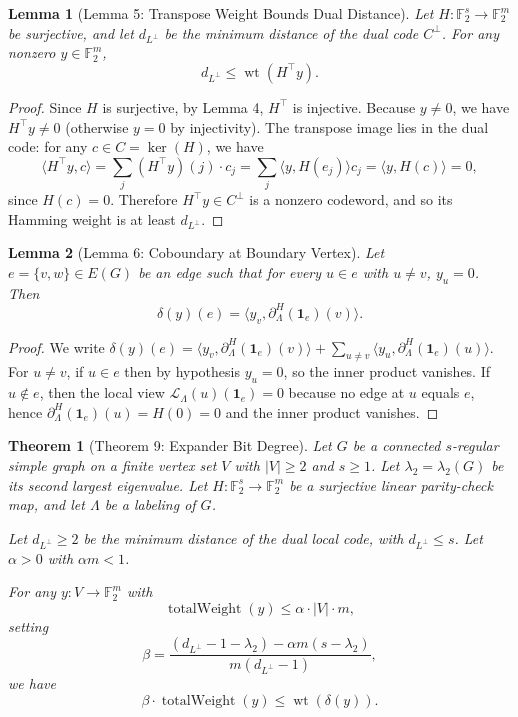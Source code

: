 \documentclass[11pt]{article}
\theoremstyle{plain}
\newtheorem*{theorem}{Theorem}
\newtheorem*{lemma}{Lemma}
\theoremstyle{definition}
\theoremstyle{remark}
\renewcommand{\ker}{\operatorname{ker}}
\begin{document}
\begin{lemma}[Lemma 5: Transpose Weight Bounds Dual Distance]
Let $H : \mathbb{F}_2^s \to \mathbb{F}_2^m$ be surjective, and let $d_{L^\perp}$ be the minimum distance of the dual code $C^\perp$. For any nonzero $y \in \mathbb{F}_2^m$,
\[
d_{L^\perp} \leq \operatorname{wt}(H^\top y).
\]
\end{lemma}

\begin{proof}
Since $H$ is surjective, by Lemma 4, $H^\top$ is injective. Because $y \neq 0$, we have $H^\top y \neq 0$ (otherwise $y = 0$ by injectivity). The transpose image lies in the dual code: for any $c \in C = \ker(H)$, we have
\[
\langle H^\top y, c \rangle = \sum_j (H^\top y)(j) \cdot c_j = \sum_j \langle y, H(e_j) \rangle c_j = \langle y, H(c) \rangle = 0,
\]
since $H(c) = 0$. Therefore $H^\top y \in C^\perp$ is a nonzero codeword, and so its Hamming weight is at least $d_{L^\perp}$.
\end{proof}

\begin{lemma}[Lemma 6: Coboundary at Boundary Vertex]
Let $e = \{v, w\} \in E(G)$ be an edge such that for every $u \in e$ with $u \neq v$, $y_u = 0$. Then
\[
\delta(y)(e) = \langle y_v, \partial_\Lambda^H(\mathbf{1}_e)(v) \rangle.
\]
\end{lemma}

\begin{proof}
We write $\delta(y)(e) = \langle y_v, \partial_\Lambda^H(\mathbf{1}_e)(v) \rangle + \sum_{u \neq v} \langle y_u, \partial_\Lambda^H(\mathbf{1}_e)(u) \rangle$. For $u \neq v$, if $u \in e$ then by hypothesis $y_u = 0$, so the inner product vanishes. If $u \notin e$, then the local view $\mathcal{L}_\Lambda(u)(\mathbf{1}_e) = 0$ because no edge at $u$ equals $e$, hence $\partial_\Lambda^H(\mathbf{1}_e)(u) = H(0) = 0$ and the inner product vanishes.
\end{proof}

\begin{theorem}[Theorem 9: Expander Bit Degree]
Let $G$ be a connected $s$-regular simple graph on a finite vertex set $V$ with $|V| \geq 2$ and $s \geq 1$. Let $\lambda_2 = \lambda_2(G)$ be its second largest eigenvalue. Let $H : \mathbb{F}_2^s \to \mathbb{F}_2^m$ be a surjective linear parity-check map, and let $\Lambda$ be a labeling of $G$.

Let $d_{L^\perp} \geq 2$ be the minimum distance of the dual local code, with $d_{L^\perp} \leq s$. Let $\alpha > 0$ with $\alpha m < 1$.

For any $y : V \to \mathbb{F}_2^m$ with
\[
\operatorname{totalWeight}(y) \leq \alpha \cdot |V| \cdot m,
\]
setting
\[
\beta = \frac{(d_{L^\perp} - 1 - \lambda_2) - \alpha m (s - \lambda_2)}{m(d_{L^\perp} - 1)},
\]
we have
\[
\beta \cdot \operatorname{totalWeight}(y) \leq \operatorname{wt}(\delta(y)).
\]
\end{theorem}
\end{document}

